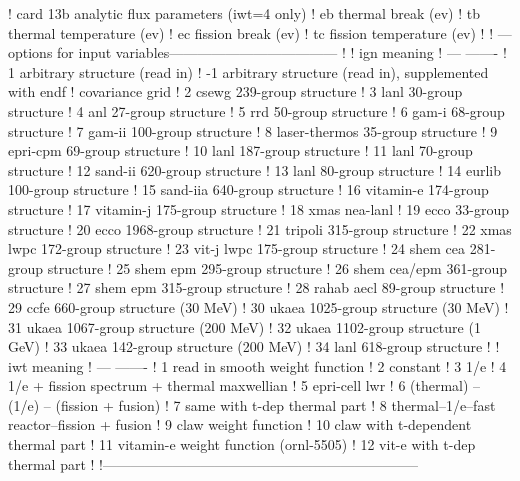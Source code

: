 \begin{ccode}
   !  card 13b  analytic flux parameters (iwt=4 only)
   !    eb      thermal break (ev)
   !    tb      thermal temperature (ev)
   !    ec      fission break (ev)
   !    tc      fission temperature (ev)
   !
   ! ---options for input variables------------------------------------
   !
   !      ign          meaning
   !      ---          -------
   !       1           arbitrary structure (read in)
   !      -1           arbitrary structure (read in), supplemented with endf
   !                   covariance grid
   !       2           csewg 239-group structure
   !       3           lanl 30-group structure
   !       4           anl 27-group structure
   !       5           rrd 50-group structure
   !       6           gam-i 68-group structure
   !       7           gam-ii 100-group structure
   !       8           laser-thermos 35-group structure
   !       9           epri-cpm 69-group structure
   !      10           lanl 187-group structure
   !      11           lanl 70-group structure
   !      12           sand-ii 620-group structure
   !      13           lanl 80-group structure
   !      14           eurlib 100-group structure
   !      15           sand-iia 640-group structure
   !      16           vitamin-e 174-group structure
   !      17           vitamin-j 175-group structure
   !      18           xmas nea-lanl
   !      19           ecco  33-group structure
   !      20           ecco 1968-group structure
   !      21           tripoli 315-group structure
   !      22           xmas lwpc 172-group structure
   !      23           vit-j lwpc 175-group structure
   !      24           shem cea 281-group structure
   !      25           shem epm 295-group structure
   !      26           shem cea/epm 361-group structure
   !      27           shem epm 315-group structure
   !      28           rahab aecl 89-group structure
   !      29           ccfe   660-group structure  (30 MeV)
   !      30           ukaea 1025-group structure  (30 MeV)
   !      31           ukaea 1067-group structure (200 MeV)
   !      32           ukaea 1102-group structure   (1 GeV)
   !      33           ukaea  142-group structure (200 MeV)
   !      34           lanl 618-group structure
   !
   !      iwt          meaning
   !      ---          -------
   !       1           read in smooth weight function
   !       2           constant
   !       3           1/e
   !       4           1/e + fission spectrum + thermal maxwellian
   !       5           epri-cell lwr
   !       6           (thermal) -- (1/e) -- (fission + fusion)
   !       7           same with t-dep thermal part
   !       8           thermal--1/e--fast reactor--fission + fusion
   !       9           claw weight function
   !      10           claw with t-dependent thermal part
   !      11           vitamin-e weight function (ornl-5505)
   !      12           vit-e with t-dep thermal part
   !
   !--------------------------------------------------------------------

\end{ccode}
\normalsize

